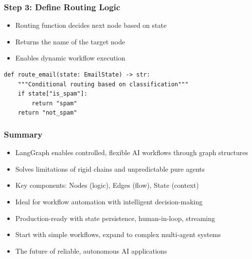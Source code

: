\begin{frame}[fragile]\frametitle{Step 3: Define Routing Logic}

      \begin{itemize}
        \item Routing function decides next node based on state
        \item Returns the name of the target node
        \item Enables dynamic workflow execution
      \end{itemize}
	  
      \begin{lstlisting}
def route_email(state: EmailState) -> str:
    """Conditional routing based on classification"""
    if state["is_spam"]:
        return "spam"
    return "not_spam"
      \end{lstlisting}
     
\end{frame}
\begin{frame}[fragile]\frametitle{Summary}
      \begin{itemize}
        \item LangGraph enables controlled, flexible AI workflows through graph structures
        \item Solves limitations of rigid chains and unpredictable pure agents
        \item Key components: Nodes (logic), Edges (flow), State (context)
        \item Ideal for workflow automation with intelligent decision-making
        \item Production-ready with state persistence, human-in-loop, streaming
        \item Start with simple workflows, expand to complex multi-agent systems
        \item The future of reliable, autonomous AI applications
      \end{itemize}
\end{frame}

